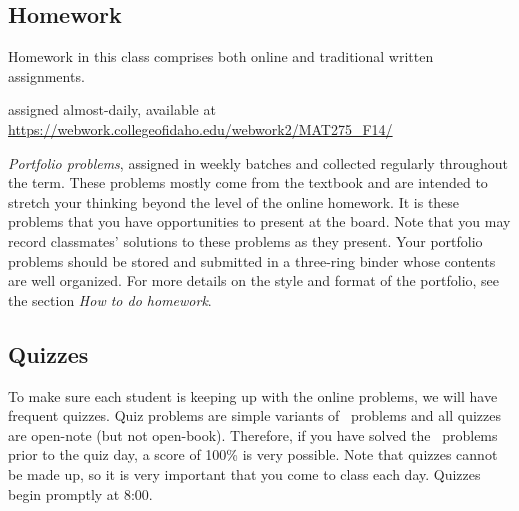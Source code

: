 \documentclass[symmetric]{tufte-handout}
\begin{document}

\subsection{Homework}

    Homework in this class comprises both online and traditional written assignments.
    \begin{compactenum}
        \item \webwork{} 
        assigned almost-daily, available at
        \url{https://webwork.collegeofidaho.edu/webwork2/MAT275_F14/}
        \item \emph{Portfolio problems}, assigned in weekly batches and collected 
        regularly throughout the term. These problems mostly come from the textbook 
        and are intended to stretch your thinking beyond the level of the online 
        homework. It is these problems that you have opportunities to present at 
        the board. Note that you may record classmates' solutions to these problems 
        as they present. Your portfolio problems should be stored and submitted in
        a three-ring binder whose contents are well organized. For more details on
        the style and format of the portfolio, see the section \emph{How to do 
        homework}.
    \end{compactenum}

\subsection{Quizzes}

    To make sure each student is keeping up with the online problems, we will
    have frequent quizzes. Quiz problems are simple  variants of \webwork\ problems
    and all quizzes are open-note (but not open-book). Therefore, if you have
    solved the \webwork\ problems prior to the quiz day, a score of 100\% is
    very possible. Note that quizzes cannot be made up, so it is very
    important that you come to class each day.  Quizzes begin promptly at
    8:00.
\end{document}
